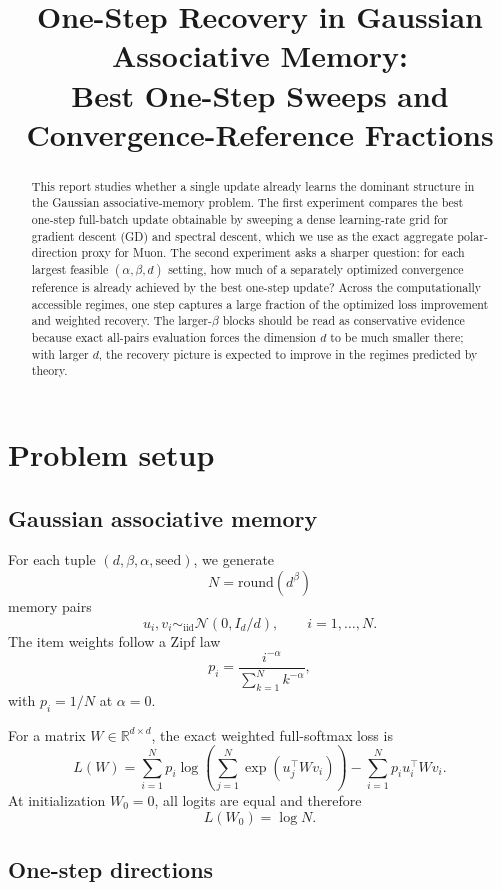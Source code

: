 \documentclass[11pt]{article}
\title{One-Step Recovery in Gaussian Associative Memory:\\
Best One-Step Sweeps and Convergence-Reference Fractions}
\author{}
\date{}
\newcommand{\R}{\mathbb{R}}
\begin{document}
\maketitle

\begin{abstract}
This report studies whether a single update already learns the dominant
structure in the Gaussian associative-memory problem.  The first experiment
compares the best one-step full-batch update obtainable by sweeping a dense
learning-rate grid for gradient descent (GD) and spectral descent, which we
use as the exact aggregate polar-direction proxy for Muon.  The second
experiment asks a sharper question: for each largest feasible
$(\alpha,\beta,d)$ setting, how much of a separately optimized convergence
reference is already achieved by the best one-step update?  Across the
computationally accessible regimes, one step captures a large fraction of
the optimized loss improvement and weighted recovery.  The larger-$\beta$
blocks should be read as conservative evidence because exact all-pairs
evaluation forces the dimension $d$ to be much smaller there; with larger
$d$, the recovery picture is expected to improve in the regimes predicted by
theory.
\end{abstract}


\section{Problem setup}

\subsection{Gaussian associative memory}

For each tuple $(d,\beta,\alpha,\mathrm{seed})$, we generate
\[
  N=\mathrm{round}(d^\beta)
\]
memory pairs
\[
  u_i,v_i\sim_{\mathrm{iid}}\mathcal{N}(0,I_d/d),
  \qquad i=1,\ldots,N.
\]
The item weights follow a Zipf law
\[
  p_i=\frac{i^{-\alpha}}{\sum_{k=1}^N k^{-\alpha}},
\]
with $p_i=1/N$ at $\alpha=0$.

For a matrix $W\in\R^{d\times d}$, the exact weighted full-softmax loss is
\[
  L(W)
  =
  \sum_{i=1}^N p_i
  \log\left(
    \sum_{j=1}^N
    \exp(u_j^\top Wv_i)
  \right)
  -
  \sum_{i=1}^N p_i u_i^\top Wv_i .
\]
At initialization $W_0=0$, all logits are equal and therefore
\[
  L(W_0)=\log N.
\]

\subsection{One-step directions}
\end{document}
